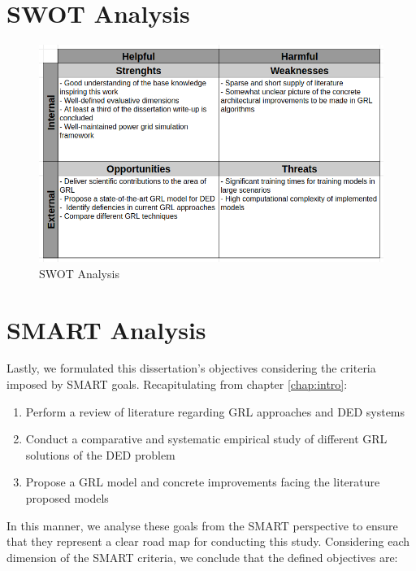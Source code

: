 \section{SWOT Analysis}

\begin{figure}[H]
	\centering
	\includegraphics[width=0.90\linewidth]{./figures/swot.png}
	\caption{SWOT Analysis}
	\label{fig:swot}
\end{figure}

\section{SMART Analysis}

Lastly, we formulated this dissertation's objectives considering the criteria imposed by SMART goals. Recapitulating from chapter \ref{chap:intro}:
\begin{enumerate}
	\item Perform a review of literature regarding \ac{GRL} approaches and \ac{DED} systems
	\item Conduct a comparative and systematic empirical study of different \ac{GRL} solutions of the \ac{DED} problem
	\item Propose a \ac{GRL} model and concrete improvements facing the literature proposed models
\end{enumerate}

In this manner, we analyse these goals from the SMART perspective to ensure that they represent a clear road map for conducting this study. Considering each dimension of the SMART criteria, we conclude that the defined objectives are:

